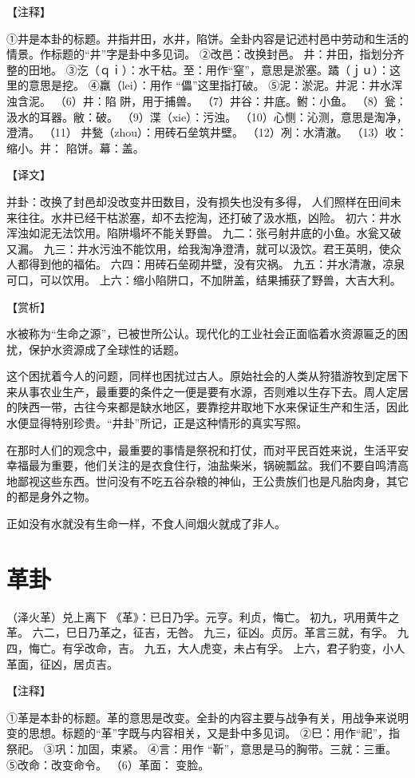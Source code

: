 \documentclass[12pt,UTF8]{ctexbook}
\begin{document}
【注释】

①井是本卦的标题。井指井田，水井，陷饼。全卦内容是记述村邑中劳动和生活的情景。作标题的“井”字是卦中多见词。
②改邑：改换封邑。 井：井田，指划分齐整的田地。
③汔（ｑｉ）：水干枯。至：用作“窒”，意思是淤塞。蹫（ｊｕ）：这里的意思是挖。
④羸（lei）：用作 “儡”这里指打破。
⑤泥：淤泥。井泥：井水浑浊含泥。
（6）井：陷 阱，用于捕兽。
（7）井谷：井底。鲋：小鱼。
（8）瓮：汲水的耳器。敝：破。
（9）渫（xie）：污浊。
（10）心恻：沁测，意思是淘净，澄清。
（11） 井甃（zhou）：用砖石垒筑井壁。
（12）冽：水清澈。
（13）收：缩小。井： 陷饼。幕：盖。

【译文】

并卦：改换了封邑却没改变井田数目，没有损失也没有多得， 人们照样在田间未来往往。水井已经干枯淤塞，却不去挖淘，还打破了汲水瓶，凶险。
初六：井水浑浊如泥无法饮用。陷阱塌坏不能关野兽。
九二：张弓射井底的小鱼。水瓮又破又漏。
九三：井水污浊不能饮用，给我淘净澄清，就可以汲饮。君王英明，使众人都得到他的福佑。
六四：用砖石垒砌井壁，没有灾祸。
九五：并水清澈，凉泉可口，可以饮用。
上六：缩小陷阱口，不加阱盖，结果捕获了野兽，大吉大利。

【赏析】

水被称为“生命之源”，已被世所公认。现代化的工业社会正面临着水资源匾乏的困扰，保护水资源成了全球性的话题。

这个困扰着今人的问题，同样也困扰过古人。原始社会的人类从狩猎游牧到定居下来从事农业生产，最重要的条件之一便是要有水源，否则难以生存下去。周人定居的陕西一带，古往今来都是缺水地区，要靠挖井取地下水来保证生产和生活，因此水便显得特别珍贵。“井卦”所记，正是这种情形的真实写照。

在那时人们的观念中，最重要的事情是祭祝和打仗，而对平民百姓来说，生活平安幸福最为重要，他们关注的是衣食住行，油盐柴米，锅碗瓢盆。我们不要自鸣清高地鄙视这些东西。世问没有不吃五谷杂粮的神仙，王公贵族们也是凡胎肉身，其它的都是身外之物。

正如没有水就没有生命一样，不食人间烟火就成了非人。

\chapter{革卦}

（泽火革）兑上离下
《革》：已日乃孚。元亨。利贞，悔亡。
初九，巩用黄牛之革。
六二，巳日乃革之，征吉，无咎。
九三，征凶。贞厉。革言三就，有孚。
九四，悔亡。有孚改命，吉。
九五，大人虎变，未占有孚。
上六，君子豹变，小人革面，征凶，居贞吉。

【注释】

①革是本卦的标题。革的意思是改变。全卦的内容主要与战争有关，用战争来说明变的思想。标题的“革”字既与内容相关，又是卦中多见词。
②巳：用作“祀”，指祭祀。
③巩：加固，束紧。
④言：用作 “靳”，意思是马的胸带。三就：三重。
⑤改命：改变命令。
（6）革面： 变脸。
\end{document}
